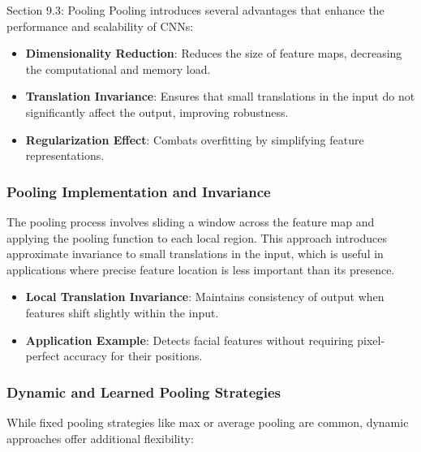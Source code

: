 \begin{notes}{Section 9.3: Pooling}
    Pooling introduces several advantages that enhance the performance and scalability of CNNs:
    
    \begin{highlight}
        \begin{itemize}
            \item \textbf{Dimensionality Reduction}: Reduces the size of feature maps, decreasing the computational and memory load.
            \item \textbf{Translation Invariance}: Ensures that small translations in the input do not significantly affect the output, improving robustness.
            \item \textbf{Regularization Effect}: Combats overfitting by simplifying feature representations.
        \end{itemize}
    \end{highlight}
    
    \subsubsection*{Pooling Implementation and Invariance}
    
    The pooling process involves sliding a window across the feature map and applying the pooling function to each local region. This approach introduces approximate invariance to small translations in the input, 
    which is useful in applications where precise feature location is less important than its presence.
    
    \begin{highlight}
        \begin{itemize}
            \item \textbf{Local Translation Invariance}: Maintains consistency of output when features shift slightly within the input.
            \item \textbf{Application Example}: Detects facial features without requiring pixel-perfect accuracy for their positions.
        \end{itemize}
    \end{highlight}
    
    \subsubsection*{Dynamic and Learned Pooling Strategies}
    
    While fixed pooling strategies like max or average pooling are common, dynamic approaches offer additional flexibility:
    

\end{notes}
